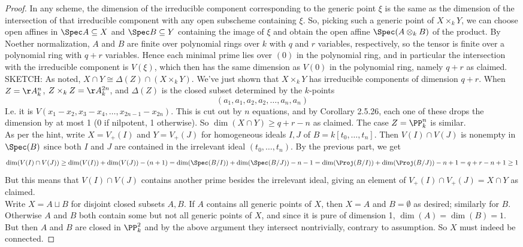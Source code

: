 \begin{proof}
	In any scheme, the dimension of the irreducible component corresponding to the generic point $\xi$ is the same as the dimension of the intersection of that irreducible component with any open subscheme containing $\xi$. So, picking such a generic point of $X \times_k Y$, we can choose open affines in $\Spec A \subseteq X$ and $\Spec B \subseteq Y$ containing the image of $\xi$ and obtain the open affine $\Spec(A \otimes_k B)$ of the product. By Noether normalization, $A$ and $B$ are finite over polynomial rings over $k$ with $q$ and $r$ variables, respectively, so the tensor is finite over a polynomial ring with $q+r$ variables. Hence each minimal prime lies over $(0)$ in the polynomial ring, and in particular the intersection with the irreducible component is $V(\xi)$, which then has the same dimension as $V(0)$ in the polynomial ring, namely $q+r$ as claimed. \\
	
	SKETCH: As noted, $X \cap Y \cong \Delta(Z) \cap (X \times_k Y)$. We've just shown that $X \times_k Y$ has irreducible components of dimension $q+r$. When $Z = \AA_k^n$, $Z \times_k Z = \AA_k^{2n}$, and $\Delta(Z)$ is the closed subset determined by the $k$-points
	\[ (a_1,a_1,a_2,a_2,\ldots,a_n,a_n) \]
	I.e. it is $V(x_1-x_2,x_3-x_4,\ldots,x_{2n-1}-x_{2n})$. This is cut out by $n$ equations, and by Corollary 2.5.26, each one of these drops the dimension by at most 1 (0 if nilpotent, 1 otherwise). So $\dim(X \cap Y) \geq q+r-n$ as claimed. The case $Z = \PP_k^n$ is similar. \\
	
	As per the hint, write $X = V_{+}(I)$ and $Y = V_{+}(J)$ for homogeneous ideals $I,J$ of $B = k[t_0,\ldots,t_n]$. Then $V(I) \cap V(J)$ is nonempty in $\Spec(B)$ since both $I$ and $J$ are contained in the irrelevant ideal $(t_0,\ldots,t_n)$. By the previous part, we get
	\[ \dim(V(I) \cap V(J)) \geq \dim(V(I))+\dim(V(J))-(n+1) = \dim(\Spec(B/I))+\dim(\Spec(B/J))-n-1 = \dim(\Proj(B/I))+\dim(\Proj(B/J))-n+1 = q+r-n+1 \geq 1 \]
	But this means that $V(I) \cap V(J)$ contains another prime besides the irrelevant ideal, giving an element of $V_{+}(I) \cap V_{+}(J) = X \cap Y$ as claimed. \\
	
	Write $X = A \sqcup B$ for disjoint closed subsets $A,B$. If $A$ contains all generic points of $X$, then $X = A$ and $B = \emptyset$ as desired; similarly for $B$. Otherwise $A$ and $B$ both contain some but not all generic points of $X$, and since it is pure of dimension 1, $\dim(A) = \dim(B) = 1$. But then $A$ and $B$ are closed in $\PP_k^2$ and by the above argument they intersect nontrivially, contrary to assumption. So $X$ must indeed be connected.
\end{proof}
